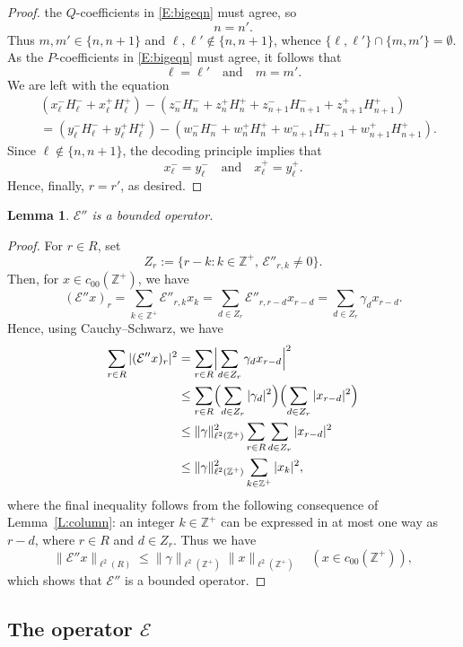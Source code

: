 \documentclass[11pt,reqno]{amsart}
\theoremstyle{plain}
\newtheorem{lemma}[theorem]{Lemma}
\theoremstyle{definition}
\theoremstyle{remark}
\newcommand{\cE}{\mathcal{E}}
\newcommand{\ZZ}{\mathbb{Z}}
\begin{document}
\begin{proof}
the $Q$-coefficients in \eqref{E:bigeqn} must agree, so 
\[
n=n'.
\]
Thus
$m,m'\in\{n,n+1\}$ and $\ell,\ell'\notin\{n,n+1\}$,
whence $\{\ell,\ell'\}\cap\{m,m'\}=\emptyset$.
As the $P$-coefficients in  \eqref{E:bigeqn} must agree,
it follows that 
\[
\ell=\ell'
\quad\text{and}\quad
m=m'.
\]
We are left with the equation
\begin{align*}
&(x_\ell^-H_\ell^-+x_\ell^+H_\ell^+)-
(z_n^-H_n^-+z_n^+H_n^++z_{n+1}^-H_{n+1}^-+z_{n+1}^+H_{n+1}^+)\\
&=(y_{\ell}^-H_{\ell}^-+y_{\ell}^+H_\ell^+)-
(w_{n}^-H_{n}^-+w_{n}^+H_{n}^++w_{n+1}^-H_{n+1}^-+w_{n+1}^+H_{n+1}^+).
\end{align*}
Since $\ell\notin\{n,n+1\}$, the decoding principle implies that
\[
x_\ell^-=y_\ell^-
\quad\text{and}\quad
x_\ell^+=y_\ell^+.
\]
Hence, finally, $r=r'$, as desired.
\end{proof}

\begin{lemma}\label{L:cE''bounded}
$\cE''$ is a bounded operator.
\end{lemma}

\begin{proof}
For $r\in R$, set 
\[
Z_r:=\{r-k:k\in\ZZ^+,\,\cE''_{r,k}\ne0\}.
\]
Then, for $x\in c_{00}(\ZZ^+)$, we have
\[
(\cE''x)_r=\sum_{k\in\ZZ^+}\cE''_{r,k}x_k=\sum_{d\in Z_r}\cE''_{r,r-d}x_{r-d}=\sum_{d\in Z_r}\gamma_d x_{r-d}.
\]
Hence, using Cauchy--Schwarz, we have
\begin{align*}
\sum_{r\in R}|(\cE''x)_r|^2
&=\sum_{r\in R}\Bigl|\sum_{d\in Z_r}\gamma_d x_{r-d}\Bigr|^2\\
&\le\sum_{r\in R}\Bigl(\sum_{d\in Z_r}|\gamma_d|^2\Bigr)\Bigl(\sum_{d\in Z_r}|x_{r-d}|^2\Bigr)\\
&\le \|\gamma\|_{\ell^2(\ZZ^+)}^2\sum_{r\in R}\sum_{d\in Z_r}|x_{r-d}|^2\\
&\le  \|\gamma\|_{\ell^2(\ZZ^+)}^2\sum_{k\in\ZZ^+}|x_k|^2,
\end{align*}
where the final inequality follows from the following consequence
of Lem\-ma~\ref{L:column}:
an integer $k\in \ZZ^+$ can be expressed in at most one way
as $r-d$, where $r\in R$ and $d\in Z_r$.
Thus we have
\[
\|\cE''x\|_{\ell^2(R)}\le  \|\gamma\|_{\ell^2(\ZZ^+)}\|x\|_{\ell^2(\ZZ^+)}
\quad(x\in c_{00}(\ZZ^+)),
\]
which shows that $\cE''$ is a bounded operator.
\end{proof}

\subsection{The operator $\cE$}
\end{document}
